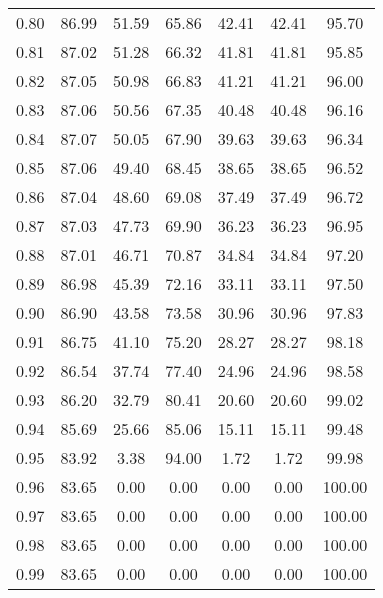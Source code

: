 \begin{tabular}{|c|c|c|c|c|c|c|}
      0.80 &     86.99 &     51.59 &      65.86 &   42.41 &      42.41 &         95.70 \\
      0.81 &     87.02 &     51.28 &      66.32 &   41.81 &      41.81 &         95.85 \\
      0.82 &     87.05 &     50.98 &      66.83 &   41.21 &      41.21 &         96.00 \\
      0.83 &     87.06 &     50.56 &      67.35 &   40.48 &      40.48 &         96.16 \\
      0.84 &     87.07 &     50.05 &      67.90 &   39.63 &      39.63 &         96.34 \\
      0.85 &     87.06 &     49.40 &      68.45 &   38.65 &      38.65 &         96.52 \\
      0.86 &     87.04 &     48.60 &      69.08 &   37.49 &      37.49 &         96.72 \\
      0.87 &     87.03 &     47.73 &      69.90 &   36.23 &      36.23 &         96.95 \\
      0.88 &     87.01 &     46.71 &      70.87 &   34.84 &      34.84 &         97.20 \\
      0.89 &     86.98 &     45.39 &      72.16 &   33.11 &      33.11 &         97.50 \\
      0.90 &     86.90 &     43.58 &      73.58 &   30.96 &      30.96 &         97.83 \\
      0.91 &     86.75 &     41.10 &      75.20 &   28.27 &      28.27 &         98.18 \\
      0.92 &     86.54 &     37.74 &      77.40 &   24.96 &      24.96 &         98.58 \\
      0.93 &     86.20 &     32.79 &      80.41 &   20.60 &      20.60 &         99.02 \\
      0.94 &     85.69 &     25.66 &      85.06 &   15.11 &      15.11 &         99.48 \\
      0.95 &     83.92 &      3.38 &      94.00 &    1.72 &       1.72 &         99.98 \\
      0.96 &     83.65 &      0.00 &       0.00 &    0.00 &       0.00 &        100.00 \\
      0.97 &     83.65 &      0.00 &       0.00 &    0.00 &       0.00 &        100.00 \\
      0.98 &     83.65 &      0.00 &       0.00 &    0.00 &       0.00 &        100.00 \\
      0.99 &     83.65 &      0.00 &       0.00 &    0.00 &       0.00 &        100.00 \\
\bottomrule
\end{tabular}
